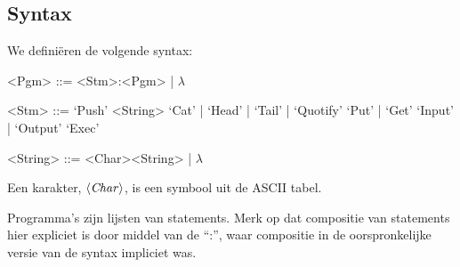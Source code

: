 \subsection{Syntax}
\label{sec:def:syn}
We definiëren de volgende syntax:
\setlength{\grammarindent}{5em}
\begin{grammar}
	<Pgm> ::= <Stm>:<Pgm> | $\lambda$ %

	<Stm> ::= `Push' <String>
		\alt `Cat' | `Head' | `Tail' | `Quotify'
		\alt `Put' | `Get'
		\alt `Input' | `Output'
		\alt `Exec'

	<String> ::= <Char><String> | $\lambda$
\end{grammar}

Een karakter, $\langle\mathit{Char}\rangle$, is een symbool uit de ASCII tabel. 

Programma's zijn lijsten van statements. Merk op dat compositie van statements hier expliciet is door middel van de ``:'', waar compositie in de oorspronkelijke versie van de syntax impliciet was.

